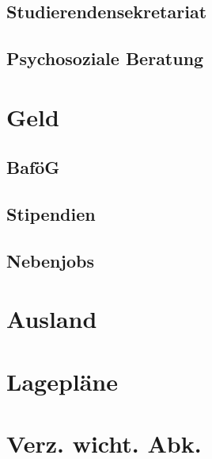 \documentclass[12pt, a4paper]{article}
\newif\ifinfo
\begin{document}
	\subsection{Studierendensekretariat}
	

	\subsection{Psychosoziale Beratung}
	
\fi

\newpage
\section{Geld}

\subsection{BaföG}


\subsection{Stipendien}


\subsection{Nebenjobs}


\ifinfo
	\newpage
\fi

\section{Ausland}


\newpage
%

\section{Lagepläne}
\ifinfo
	
\else
	
\fi
\newpage


\section*{Verz. wicht. Abk.}

\ifinfo
	\pagebreak
\fi
\end{document}
